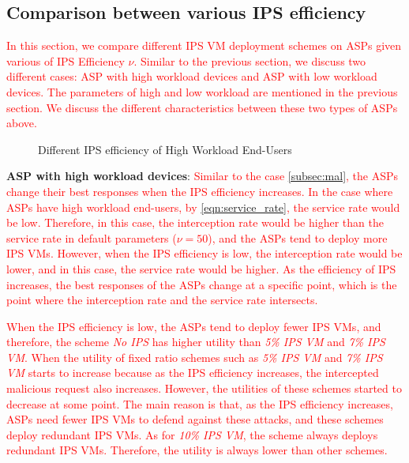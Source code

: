\documentclass[10pt,journal, compsoc]{IEEEtran}
\begin{document}
\subsection{Comparison between various IPS efficiency}
\textcolor{red}{In this section, we compare different IPS VM deployment schemes on ASPs given various of IPS Efficiency $\nu$. Similar to the previous section, we discuss two different cases: ASP with high workload devices and ASP with low workload devices. The parameters of high and low workload are mentioned in the previous section. We discuss the different characteristics between these two types of ASPs above. }

\begin{figure}[!]
\captionsetup{justification=centering}
  \hfill
  \hfill
\label{fig:eff_high}
\caption{Different IPS efficiency of High Workload End-Users}
\end{figure}
\textbf{ASP with high workload devices}:
\textcolor{red}{
Similar to the case \cref{subsec:mal}, the ASPs change their best responses when the IPS efficiency increases. In the case where ASPs have high workload end-users, by \cref{eqn:service_rate}, the service rate would be low. Therefore, in this case, the interception rate would be higher than the service rate in default parameters ($\nu = 50$), and the ASPs tend to deploy more IPS VMs. However, when the IPS efficiency is low, the interception rate would be lower, and in this case, the service rate would be higher. As the efficiency of IPS increases, the best responses of the ASPs change at a specific point, which is the point where the interception rate and the service rate intersects.}

\textcolor{red}{
When the IPS efficiency is low, the ASPs tend to deploy fewer IPS VMs, and therefore, the scheme \textit{No IPS} has higher utility than \textit{5\% IPS VM} and \textit{7\% IPS VM}. When the utility of fixed ratio schemes such as \textit{5\% IPS VM} and \textit{7\% IPS VM} starts to increase because as the IPS efficiency increases, the intercepted malicious request also increases. However, the utilities of these schemes started to decrease at some point. The main reason is that, as the IPS efficiency increases, ASPs need fewer IPS VMs to defend against these attacks, and these schemes deploy redundant IPS VMs. As for \textit{10\% IPS VM}, the scheme always deploys redundant IPS VMs. Therefore, the utility is always lower than other schemes.}
\end{document}
